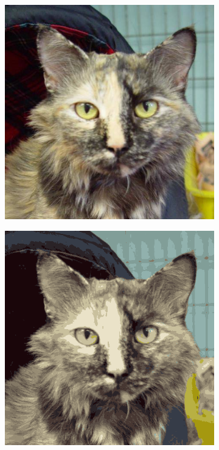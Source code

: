 \begin{figure}[htbp]
    \centering
    \caption{
        Case study: \texttt{cat-10.jpg}, $k=15$.
        Original image, reconstructed image using k-means, reconstruction error,
        and clusterings in sample space.
    }
    \begin{subfigure}[t]{0.32\textwidth}
        \includegraphics[width=\linewidth]{../../rust_code/data/kmeans/cat-10.jpg}
    \end{subfigure}
    \begin{subfigure}[t]{0.32\textwidth}
        \includegraphics[width=\linewidth]{../../python_code/plots/kmeans/cat-10/reconstruction.png}

\end{subfigure}
\end{figure}
